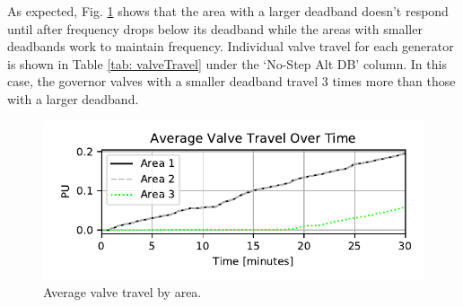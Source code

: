 As expected, Fig. \ref{fig: areaValveTravel} shows that the area with a larger deadband doesn't respond until after frequency drops below its deadband while the areas with smaller deadbands work to maintain frequency. 
Individual valve travel for each generator is shown in Table \ref{tab: valveTravel} under the `No-Step Alt DB' column.
In this case, the governor valves with a smaller deadband travel 3 times more than those with a larger deadband.

\begin{figure}[!ht]
\centering
\includegraphics[width=\linewidth]{figures/miniWECCuniAccVTOverTime}
\caption{Average valve travel by area.}
\label{fig: areaValveTravel}
\end{figure}